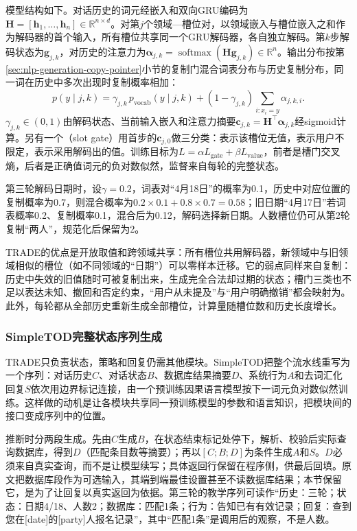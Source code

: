 模型结构如下。对话历史的词元经嵌入和双向GRU编码为$\bm{H}=[\bm{h}_1,\ldots,\bm{h}_n]\in\mathbb{R}^{n\times d}$。对第$j$个领域—槽位对，以领域嵌入与槽位嵌入之和作为解码器的首个输入，所有槽位共享同一个GRU解码器，各自独立解码。第$k$步解码状态为$\bm{g}_{j,k}$，对历史的注意力为$\bm{\alpha}_{j,k}=\operatorname{softmax}(\bm{H}\bm{g}_{j,k})\in\mathbb{R}^{n}$。输出分布按第\ref{sec:nlp-generation-copy-pointer}小节的复制门混合词表分布与历史复制分布，同一词在历史中多次出现时复制概率相加：
\begin{equation}
 p(y\mid j,k)=
 \gamma_{j,k}\,p_{\mathrm{vocab}}(y\mid j,k)
 + (1-\gamma_{j,k})\sum_{i:x_i=y}\alpha_{j,k,i}.
 \label{eq:nlp-dialogue-trade}
\end{equation}
$\gamma_{j,k}\in(0,1)$由解码状态、当前输入嵌入和注意力摘要$\bm{c}_{j,k}=\bm{H}^\top\bm{\alpha}_{j,k}$经sigmoid计算。另有一个（slot gate）用首步的$\bm{c}_{j,0}$做三分类：表示该槽位无值，表示用户不限定，表示采用解码出的值。训练目标为$L=\alpha L_{\mathrm{gate}}+\beta L_{\mathrm{value}}$，前者是槽门交叉熵，后者是正确值词元的负对数似然，监督来自每轮的完整状态。

第三轮解码日期时，设$\gamma=0.2$，词表对“4月18日”的概率为0.1，历史中对应位置的复制概率为0.7，则混合概率为$0.2\times0.1+0.8\times0.7=0.58$；旧日期“4月17日”若词表概率0.2、复制概率0.1，混合后为0.12，解码选择新日期。人数槽位仍可从第2轮复制“两人”，规范化后保留为2。

TRADE的优点是开放取值和跨领域共享：所有槽位共用解码器，新领域中与旧领域相似的槽位（如不同领域的“日期”）可以零样本迁移。它的弱点同样来自复制：历史中失效的旧值随时可被复制出来，生成完全合法却过期的状态；槽门三类也不足以表达未知、撤回和否定约束，“用户从未提及”与“用户明确撤销”都会映射为。此外，每轮都从全部历史重新生成全部槽位，计算量随槽位数和历史长度增长。

\subsubsection{SimpleTOD完整状态序列生成}
\label{sec:nlp-dialogue-simpletod}

TRADE只负责状态，策略和回复仍需其他模块。SimpleTOD把整个流水线重写为一个序列：对话历史$C$、对话状态$B$、数据库结果摘要$D$、系统行为$A$和去词汇化回复$S$依次用边界标记连接，由一个预训练因果语言模型按下一词元负对数似然训练。这样做的动机是让各模块共享同一预训练模型的参数和语言知识，把模块间的接口变成序列中的位置。

推断时分两段生成。先由$C$生成$B$，在状态结束标记处停下，解析、校验后实际查询数据库，得到$D$（匹配条目数等摘要）；再以$[C;B;D]$为条件生成$A$和$S$。$D$必须来自真实查询，而不是让模型续写；具体返回行保留在程序侧，供最后回填。原文把数据库段作为可选输入，其端到端最佳设置甚至不读数据库结果；本节保留它，是为了让回复以真实返回为依据。第三轮的教学序列可读作“历史：三轮；状态：日期4/18、人数2；数据库：匹配1条；行为：告知已有有效记录；回复：查到您在[date]的[party]人报名记录”，其中“匹配1条”是调用后的观察，不是人数。

